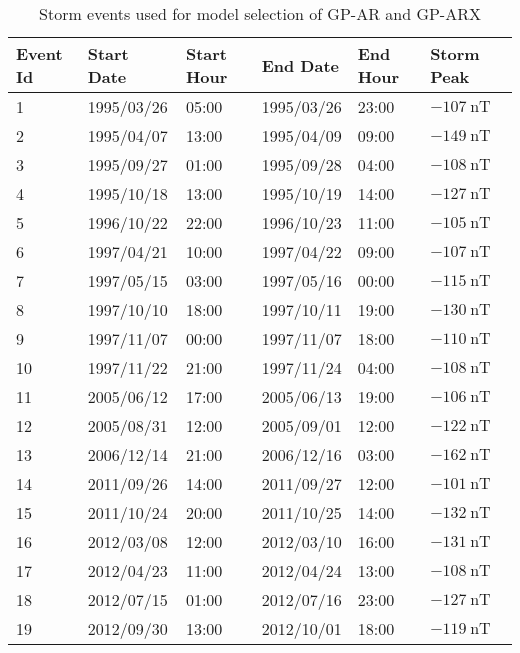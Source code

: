     
\begin{table}[h]
    \centering
    \caption{Storm events used for model selection of GP-AR and GP-ARX}
    \label{table:validationstorms}
    \begin{tabular}{llllll}
    \hline
    \textbf{Event Id} & \textbf{Start Date} & \textbf{Start Hour} & \textbf{End Date} & \textbf{End Hour} & \textbf{Storm Peak} \\ \hline
    1 & 1995/03/26 & 05:00 & 1995/03/26 & 23:00 & $ \SI{-107}{\nano\tesla}$ \\
    2 & 1995/04/07 & 13:00 & 1995/04/09 & 09:00 & $ \SI{-149}{\nano\tesla}$ \\
    3 & 1995/09/27 & 01:00 & 1995/09/28 & 04:00 & $ \SI{-108}{\nano\tesla}$ \\
    4 & 1995/10/18 & 13:00 & 1995/10/19 & 14:00 & $ \SI{-127}{\nano\tesla}$ \\
    5 & 1996/10/22 & 22:00 & 1996/10/23 & 11:00 & $ \SI{-105}{\nano\tesla}$ \\
    6 & 1997/04/21 & 10:00 & 1997/04/22 & 09:00 & $ \SI{-107}{\nano\tesla}$ \\
    7 & 1997/05/15 & 03:00 & 1997/05/16 & 00:00 & $ \SI{-115}{\nano\tesla}$ \\
    8 & 1997/10/10 & 18:00 & 1997/10/11 & 19:00 & $ \SI{-130}{\nano\tesla}$ \\
    9 & 1997/11/07 & 00:00 & 1997/11/07 & 18:00 & $ \SI{-110}{\nano\tesla}$ \\
    10 & 1997/11/22 & 21:00 & 1997/11/24 & 04:00 & $ \SI{-108}{\nano\tesla}$ \\
    11 & 2005/06/12 & 17:00 & 2005/06/13 & 19:00 & $ \SI{-106}{\nano\tesla}$ \\
    12 & 2005/08/31 & 12:00 & 2005/09/01 & 12:00 & $ \SI{-122}{\nano\tesla}$ \\
    13 & 2006/12/14 & 21:00 & 2006/12/16 & 03:00 & $ \SI{-162}{\nano\tesla}$ \\
    14 & 2011/09/26 & 14:00 & 2011/09/27 & 12:00 & $ \SI{-101}{\nano\tesla}$ \\
    15 & 2011/10/24 & 20:00 & 2011/10/25 & 14:00 & $ \SI{-132}{\nano\tesla}$ \\
    16 & 2012/03/08 & 12:00 & 2012/03/10 & 16:00 & $ \SI{-131}{\nano\tesla}$ \\
    17 & 2012/04/23 & 11:00 & 2012/04/24 & 13:00 & $ \SI{-108}{\nano\tesla}$ \\
    18 & 2012/07/15 & 01:00 & 2012/07/16 & 23:00 & $ \SI{-127}{\nano\tesla}$ \\
    19 & 2012/09/30 & 13:00 & 2012/10/01 & 18:00 & $ \SI{-119}{\nano\tesla}$ \\

\end{tabular}
\end{table}
